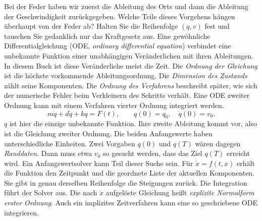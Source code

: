 Bei der Feder haben wir zuerst die Ableitung des Orts und dann die Ableitung der Geschwindigkeit zurückgegeben. Welche Teile dieses Vorgehens hängen überhaupt von der Feder ab? Halten Sie die Reihenfolge \((q,v)\) fest und tauschen Sie gedanklich nur das Kraftgesetz aus.
Eine gewöhnliche Differentialgleichung (ODE, \emph{ordinary differential equation}) verbindet eine unbekannte Funktion einer unabhängigen Veränderlichen mit ihren Ableitungen. In diesem Buch ist diese Veränderliche meist die Zeit. Die \emph{Ordnung der Gleichung} ist die höchste vorkommende Ableitungsordnung. Die \emph{Dimension des Zustands} zählt seine Komponenten. Die \emph{Ordnung des Verfahrens} beschreibt später, wie sich der numerische Fehler beim Verkleinern des Schritts verhält. Eine ODE zweiter Ordnung kann mit einem Verfahren vierter Ordnung integriert werden.
\[
 m\ddot q+d\dot q+kq=F(t),\qquad q(0)=q_0,\quad \dot q(0)=v_0 .
\]
\(q\) ist hier die einzige unbekannte Funktion. Ihre zweite Ableitung kommt vor, also ist die Gleichung zweiter Ordnung. Die beiden Anfangswerte haben unterschiedliche Einheiten. Zwei Vorgaben \(q(0)\) und \(q(T)\) wären dagegen \emph{Randdaten}. Dann muss etwa \(v_0\) so gesucht werden, dass das Ziel \(q(T)\) erreicht wird. Ein Anfangswertsolver kann Teil dieser Suche sein.
Für \(\dot x=f(t,x)\) erhält die Funktion den Zeitpunkt und die geordnete Liste der aktuellen Komponenten. Sie gibt in genau derselben Reihenfolge die Steigungen zurück. Die Integration führt der Solver aus. Die nach \(\dot x\) aufgelöste Gleichung heißt \emph{explizite Normalform erster Ordnung}. Auch ein implizites Zeitverfahren kann eine so geschriebene ODE integrieren.

